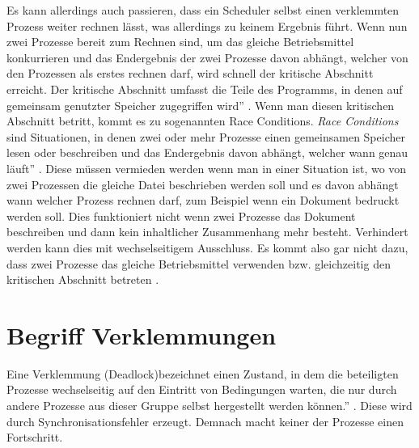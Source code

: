 Es kann allerdings auch passieren, dass ein Scheduler selbst einen verklemmten Prozess weiter rechnen lässt, was allerdings zu keinem Ergebnis führt.
Wenn nun zwei Prozesse bereit zum Rechnen sind, um das gleiche Betriebsmittel konkurrieren und das Endergebnis der zwei Prozesse davon abhängt, welcher von den Prozessen als erstes rechnen darf, wird schnell der kritische Abschnitt erreicht. Der kritische Abschnitt umfasst \glqq die Teile des Programms, in denen auf gemeinsam genutzter Speicher zugegriffen wird'' \parencite[S. 164]{tanenbaum2016}. Wenn man diesen kritischen Abschnitt betritt, kommt es zu sogenannten Race Conditions. \textit{Race Conditions} sind Situationen, \glqq in denen zwei oder mehr Prozesse einen gemeinsamen Speicher lesen oder beschreiben und das Endergebnis davon abhängt, welcher wann genau läuft'' \parencite[S. 166 f.]{tanenbaum2016}. Diese müssen vermieden werden wenn man in einer Situation ist, wo von zwei Prozessen die gleiche Datei beschrieben werden soll und es davon abhängt wann welcher Prozess rechnen darf, zum Beispiel wenn ein Dokument bedruckt werden soll. Dies funktioniert nicht wenn zwei Prozesse das Dokument beschreiben und dann kein inhaltlicher Zusammenhang mehr besteht. Verhindert werden kann dies mit wechselseitigem Ausschluss. Es kommt also gar nicht dazu, dass zwei Prozesse das gleiche Betriebsmittel verwenden bzw. gleichzeitig den kritischen Abschnitt betreten \parencite [vgl][S.471]{sommer2002}.

\section{Begriff Verklemmungen}
\glqq Eine Verklemmung (Deadlock)bezeichnet einen Zustand, in dem die beteiligten Prozesse wechselseitig auf den Eintritt von Bedingungen warten, die nur durch andere Prozesse aus dieser Gruppe selbst hergestellt werden können.'' \parencite[S.248]{sturm2001}. Diese wird durch Synchronisationsfehler erzeugt. 
Demnach macht keiner der Prozesse einen Fortschritt.

